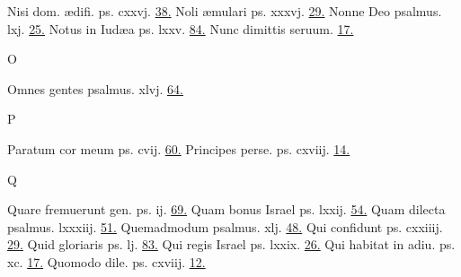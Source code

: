 \documentclass[a5paper,10pt]{book}
\def\ae{æ}
\begin{document}
\begin{multicols}{2}
\newline Nisi dom. \ae difi. ps. cxxvj. \hfill \hyperlink{ps126}{38.}
\newline Noli \ae mulari ps. xxxvj. \hfill \hyperlink{ps36}{29.}
\newline Nonne Deo psalmus. lxj. \hfill \hyperlink{ps61}{25.}
\newline Notus in Iud\ae a ps. lxxv. \hfill \hyperlink{ps75}{84.}
\newline Nunc dimittis seruum. \hfill \hyperlink{Nunc}{17.}
\newline \vspace{-1.75em}
\begin{center}
\color{red} O
\end{center}
\vspace{-.75em}
\par \noindent Omnes gentes psalmus. xlvj. \hfill \hyperlink{ps46}{64.}
\newline \vspace{-1.75em}
\begin{center}
\color{red} P
\end{center}
\vspace{-.75em}
\par \noindent Paratum cor meum ps. cvij. \hfill \hyperlink{ps107}{60.}
\newline Principes perse. ps. cxviij. \hfill \hyperlink{ps118.11}{14.}
\newline \vspace{-1.75em}
\begin{center}
\color{red} Q
\end{center}
\vspace{-.75em}
\par \noindent Quare fremuerunt gen. ps. ij. \hfill \hyperlink{ps2}{69.}
\newline Quam bonus Israel ps. lxxij. \hfill \hyperlink{ps72}{54.}
\newline Quam dilecta psalmus. lxxxiij. \hfill \hyperlink{ps83}{51.}
\newline Quemadmodum psalmus. xlj. \hfill \hyperlink{ps41}{48.}
\newline Qui confidunt ps. cxxiiij. \hfill \hyperlink{ps124}{29.}
\newline Quid gloriaris ps. lj. \hfill \hyperlink{ps51}{83.}
\newline Qui regis Israel ps. lxxix. \hfill \hyperlink{ps79}{26.}
\newline Qui habitat in adiu. ps. xc. \hfill \hyperlink{ps90}{17.}
\newline Quomodo dile. ps. cxviij. \hfill \hyperlink{ps118.7}{12.}

\end{multicols}
\end{document}
